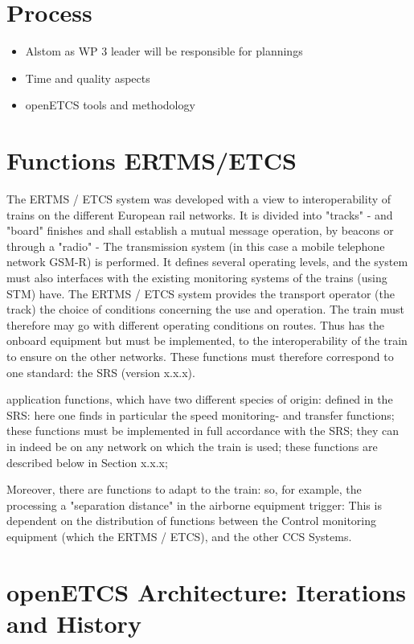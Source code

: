 \documentclass{template/openetcs_report}
\begin{document}
\section{Process}
\begin{itemize}
\item Alstom as WP 3 leader will be responsible for plannings
\item Time and quality aspects
\item openETCS tools and methodology
\end{itemize}


\section{Functions ERTMS/ETCS}


The ERTMS / ETCS system was developed with a view to interoperability of trains on the 
different European rail networks. It is divided into "tracks" - and "board" finishes 
and shall establish a mutual message operation, by beacons or through a "radio" - 
The transmission system (in this case a mobile telephone network GSM-R) is performed. 
It defines several operating levels, and the system must also interfaces with the 
existing monitoring systems of the trains (using STM) have. 
The ERTMS / ETCS system provides the transport operator (the track) the choice of conditions 
concerning the use and operation. 
The train must therefore may go with different operating conditions on routes. 
Thus has the onboard equipment but must be implemented, 
to the interoperability of the train to ensure on the other networks. 
These functions must therefore correspond to one standard: the SRS (version x.x.x). 

application functions, which have two different species of origin: 
defined in the SRS: here one finds in particular the 
speed monitoring- and transfer functions; these functions 
must be implemented in full accordance with the SRS; they can in 
indeed be on any network on which the train is used; these functions 
are described below in Section x.x.x; 


Moreover, there are functions to adapt to the train: so, for example, the processing 
a "separation distance" in the airborne equipment trigger: 
This is dependent on the distribution of functions between the 
Control monitoring equipment (which the ERTMS / ETCS), and the other 
CCS Systems.

\section{openETCS Architecture: Iterations and History}
\end{document}
